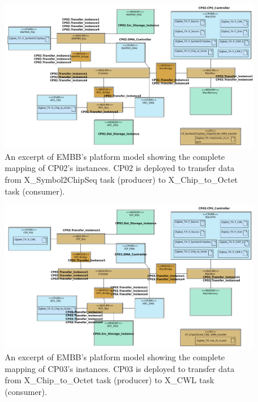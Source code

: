 \documentclass{llncs}
\begin{document}
%
\begin{figure}[!htbp]
	\centering
	\includegraphics[angle=90,origin=c,height=0.8\paperwidth]{figures/evaluation/Architecture_Excerpt.pdf}
    \caption{An excerpt of EMBB's platform model showing the complete mapping of CP02's instances. CP02 is deployed to
        transfer data from X\_Symbol2ChipSeq task (producer) to X\_Chip\_to\_Octet task (consumer).}
	\label{fig:ArchExcerptCP02}
\end{figure}
%
\begin{figure}[!htbp]
	\centering
	\includegraphics[angle=90,origin=c,height=0.8\paperwidth]{figures/evaluation/MappingCP03.pdf}
    \caption{An excerpt of EMBB's platform model showing the complete mapping of CP03's instances. CP03 is deployed to
        transfer data from X\_Chip\_to\_Octet task (producer) to X\_CWL task (consumer).}
	\label{fig:ArchExcerptCP03}
\end{figure}
%
\end{document}
